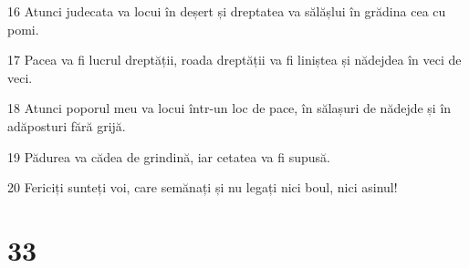 \par 16 Atunci judecata va locui în deșert și dreptatea va sălășlui în grădina cea cu pomi.
\par 17 Pacea va fi lucrul dreptății, roada dreptății va fi liniștea și nădejdea în veci de veci.
\par 18 Atunci poporul meu va locui într-un loc de pace, în sălașuri de nădejde și în adăposturi fără grijă.
\par 19 Pădurea va cădea de grindină, iar cetatea va fi supusă.
\par 20 Fericiți sunteți voi, care semănați și nu legați nici boul, nici asinul!

\chapter{33}

